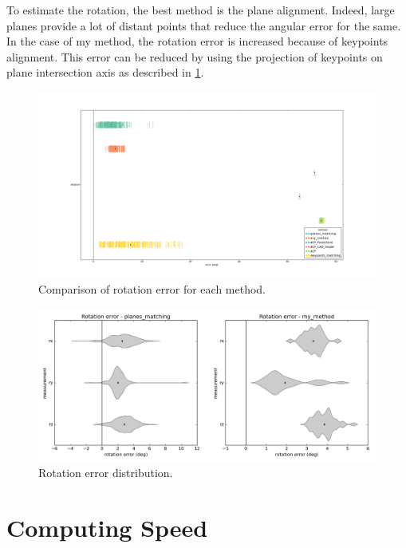 To estimate the rotation, the best method is the plane alignment. Indeed, large planes provide a lot of distant points that reduce the angular error for the same. In the case of my method, the rotation error is increased because of keypoints alignment. This error can be reduced by using the projection of keypoints on plane intersection axis as described in \ref{}.

\begin{figure}[h!]
    \centering
    \includegraphics[width=\textwidth]{images/rot_comp.png}
    \caption{Comparison of rotation error for each method.}
    \label{fig:rot_comp}
\end{figure}

\begin{figure}[h!]
    \centering
    \includegraphics[width=\textwidth]{images/rot_violin.png}
    \caption{Rotation error distribution.}
    \label{fig:rot_violin}
\end{figure}

\section{Computing Speed}